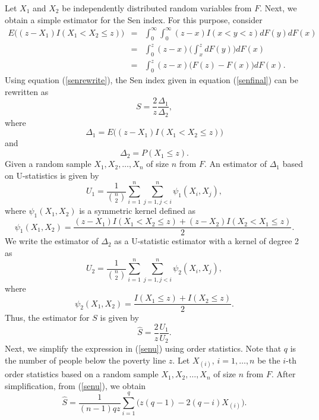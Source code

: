 \documentclass[11pt]{article}
\begin{document}
  Let $X_1$ and $X_2$ be independently distributed random variables from $F$. Next, we obtain a simple estimator for the Sen index. For this purpose, consider
\begin{eqnarray}\label{senrewrite}
E\big((z-X_1)I(X_1<X_2 \le z)\big)&=& \int_{0}^{\infty}\int_{0}^{\infty}(z-x)I(x<y<z)dF(y)dF(x)\nonumber\\
&=&\int_{0}^{z}(z-x)\big(\int_{x}^{z}dF(y)\big)dF(x)\nonumber\\
&=&\int_{0}^{z}(z-x)\big(F(z)-F(x)\big)dF(x).
\end{eqnarray}
Using equation (\ref{senrewrite}), the Sen index given in equation  (\ref{senfinal}) can be rewritten as
\begin{equation}\label{21}
S=\frac{2}{z}\frac{\Delta_1}{\Delta_2},
    \end{equation}where
\begin{equation*}
  \Delta_1=E\big((z-X_1)I(X_1<X_2 \le z)\big)
\end{equation*}
and
\begin{equation*}
  \Delta_2=P(X_1 \le z).
\end{equation*}
Given a random sample $X_1,X_2,\ldots, X_n$ of size $n$ from $F$. An estimator of $\Delta_1$ based on U-statistics is given by
\begin{equation*}
  U_{1}=\frac{1}{\binom{n}{2}}\sum_{i=1}^{n}\sum_{j=1,j<i}^{n}\psi_{1}(X_i,X_j),
\end{equation*}
where $\psi_{1}(X_1,X_2)$ is a symmetric kernel defined as
$$\psi_{1}(X_1,X_2)=\frac{(z-X_1)I(X_1<X_2 \le z)+(z-X_{2})I(X_2<X_1 \le z)}{2}.$$
We write the estimator of $\Delta_2$  as a U-statistic estimator with a kernel of degree 2 as
\begin{equation*}
  U_{2}=\frac{1}{\binom{n}{2}}\sum_{i=1}^{n}\sum_{j=1,j<i}^{n}\psi_{2}(X_i,X_j),
\end{equation*}
where
 $$\psi_{2}(X_1,X_2)=\frac{I(X_1 \le z)+I(X_2 \le z)}{2}.$$
 Thus, the estimator for $S$ is given by
 \begin{equation}\label{senu}
  \widehat{S}=\frac{2}{z}\frac{U_1}{U_2}.
 \end{equation}Next, we simplify the expression in (\ref{senu}) using order statistics. Note that $q$ is the number of  people below the poverty line $z$. Let $X_{(i)},\,i=1,\ldots,n$ be the $i$-th order statistics based on a random sample $X_1,X_2,\ldots, X_n$ of size $n$ from $F$.      After simplification, from  (\ref{senu}), we obtain %
 \textit{\begin{equation}\label{senustat}
 \widehat{S}=\frac{1}{(n-1)qz}\sum_{i=1}^{q}\big(z(q-1)-2(q-i)X_{(i)}\big).
 \end{equation}}
\end{document}
